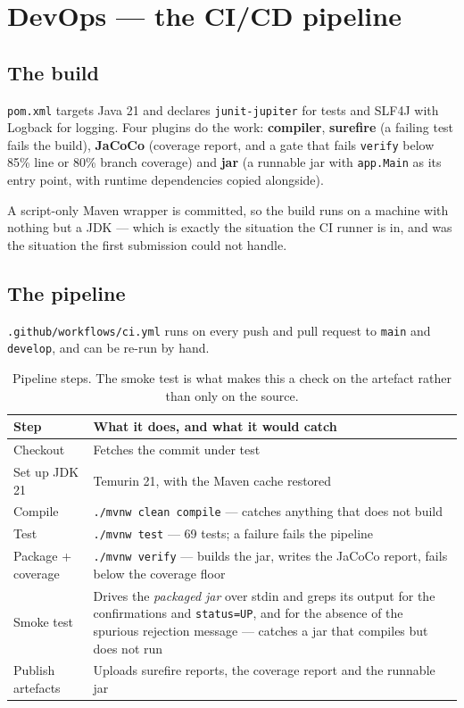 \documentclass[11pt,a4paper]{article}
\newcommand{\code}[1]{\texttt{\small #1}}
\begin{document}
\section{DevOps --- the CI/CD pipeline}

\subsection{The build}

\code{pom.xml} targets Java 21 and declares \code{junit-jupiter} for tests and
SLF4J with Logback for logging. Four plugins do the work: \textbf{compiler},
\textbf{surefire} (a failing test fails the build), \textbf{JaCoCo} (coverage
report, and a gate that fails \code{verify} below 85\% line or 80\% branch
coverage) and \textbf{jar} (a runnable jar with \code{app.Main} as its entry
point, with runtime dependencies copied alongside).

A script-only Maven wrapper is committed, so the build runs on a machine with
nothing but a JDK --- which is exactly the situation the CI runner is in, and
was the situation the first submission could not handle.

\subsection{The pipeline}

\code{.github/workflows/ci.yml} runs on every push and pull request to
\code{main} and \code{develop}, and can be re-run by hand.

\begin{table}[h]
\centering
\small
\begin{tabularx}{\textwidth}{@{}l X@{}}
\toprule
\textbf{Step} & \textbf{What it does, and what it would catch} \\
\midrule
Checkout & Fetches the commit under test \\
Set up JDK 21 & Temurin 21, with the Maven cache restored \\
Compile & \code{./mvnw clean compile} --- catches anything that does not build \\
Test & \code{./mvnw test} --- 69 tests; a failure fails the pipeline \\
Package + coverage & \code{./mvnw verify} --- builds the jar, writes the JaCoCo report, fails below the coverage floor \\
Smoke test & Drives the \emph{packaged jar} over stdin and greps its output for the confirmations and \code{status=UP}, and for the absence of the spurious rejection message --- catches a jar that compiles but does not run \\
Publish artefacts & Uploads surefire reports, the coverage report and the runnable jar \\
\bottomrule
\end{tabularx}
\caption{Pipeline steps. The smoke test is what makes this a check on the
artefact rather than only on the source.}
\end{table}
\end{document}
